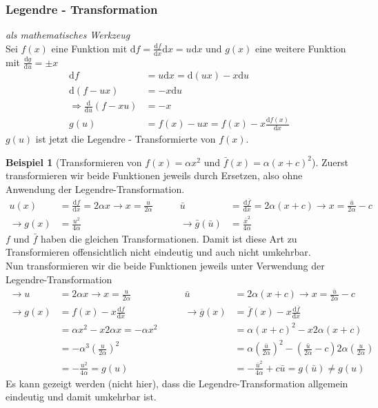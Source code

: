 \documentclass[oneside]{book}
\theoremstyle{definition}
\newtheorem*{beispiel*}{Beispiel}
\renewcommand{\d}{\mathrm d}
\newcommand{\md}{\d}
\begin{document}
\subsubsection{Legendre - Transformation} \textit{als mathematisches Werkzeug}\\
Sei $f(x)$ eine Funktion mit $\md f = \frac{\md f}{\md x} \md x = u \md x$ und $g(x)$ eine weitere Funktion mit $\frac{\md g}{\md u} = \pm x$
\begin{align*}
\md f &= u\md x = \md (ux) - x\md u\\
\md (f-ux) &= - x \md u\\
\Rightarrow \frac{\md}{\md u}(f-xu) &= -x\\
g(u) &= f(x) - ux = f(x) - x\frac{\md f(x)}{\md x}
\end{align*}
$g(u)$ ist jetzt die Legendre - Transformierte von $f(x)$.
	
	
	
\begin{beispiel*}[Transformieren von $f(x) = \alpha x^2$ und $\bar{f}(x) = \alpha(x+c)^2$]
	Zuerst transformieren wir beide Funktionen jeweils durch Ersetzen, also ohne Anwendung der Legendre-Transformation.
\begin{align*}
u(x) &= \frac{\md f}{\md x} = 2 \alpha x \rightarrow x= \frac{u}{2\alpha} & \qquad   \bar u &= \frac{\md \bar f}{\md x} = 2\alpha(x+c) \rightarrow x=\frac{\bar u}{2\alpha} - c\\
\rightarrow g(x) &= \frac{u^2}{4\alpha} & \qquad  \rightarrow \bar g(\bar u) &= \frac{\bar x^2}{4\alpha}
\end{align*}
$f$ und $\bar f$ haben die gleichen Transformationen. Damit ist diese Art zu Transformieren offensichtlich nicht eindeutig und auch nicht umkehrbar.\\
Nun transformieren wir die beide Funktionen jeweils unter Verwendung der Legendre-Transformation
\begin{align*}
\rightarrow u &= 2\alpha x \rightarrow x= \frac {u}{2\alpha}      &  \qquad \bar{u} &= 2\alpha (x+c) \rightarrow x= \frac {\bar{u}}{2\alpha} -c\\
\rightarrow g(x) &= f(x) - x\frac{\md f}{\md x}  &  \qquad   \rightarrow \overline g(x) &= \overline f(x) - x\frac{\md \overline f}{\md x}\\
&= \alpha x^2 - x2\alpha x = -\alpha x^2         &    \qquad    &= \alpha (x+c)^2 - x 2\alpha( x+c)\\
&=-\alpha^3(\frac{u}{2\alpha})^2      &  \qquad    &= \alpha (\frac {\bar{u}}{2\alpha})^2 - (\frac {\bar u}{2\alpha} -c) 2\alpha( \frac {u}{2\alpha} )\\
&= -\frac{u^2}{4\alpha} = g(u)   &  \qquad    &= -\frac {\bar{u}^2}{4\alpha} +c\bar{u} = g(\bar{u}) \neq g(u)
\end{align*}
Es kann gezeigt werden (nicht hier), dass die Legendre-Transformation allgemein eindeutig und damit umkehrbar ist.
\end{beispiel*}
\end{document}
